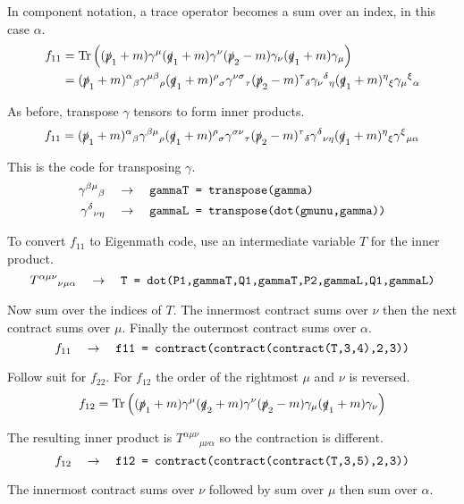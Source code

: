 \documentclass[12pt]{article}
\begin{document}
\noindent
In component notation, a trace operator becomes a sum over an index, in this case $\alpha$.
\begin{align*}
f_{11}
&=
\mathop{\rm Tr}
\left(
(\slashed{p}_1+m)\gamma^\mu(\slashed{q}_1+m)\gamma^\nu(\slashed{p}_2-m)\gamma_\nu(\slashed{q}_1+m)\gamma_\mu
\right)\\
&=
(\slashed{p}_1+m)^\alpha{}_\beta
\gamma^{\mu\beta}{}_\rho
(\slashed{q}_1+m)^\rho{}_\sigma
\gamma^{\nu\sigma}{}_\tau
(\slashed{p}_2-m)^\tau{}_\delta
\gamma_\nu{}^\delta{}_\eta
(\slashed{q}_1+m)^\eta{}_\xi
\gamma_\mu{}^\xi{}_\alpha
\end{align*}

\noindent
As before, transpose $\gamma$ tensors to form inner products.
\begin{equation*}
f_{11}=
(\slashed{p}_1+m)^\alpha{}_\beta
\gamma^{\beta\mu}{}_\rho
(\slashed{q}_1+m)^\rho{}_\sigma
\gamma^{\sigma\nu}{}_\tau
(\slashed{p}_2-m)^\tau{}_\delta
\gamma^\delta{}_{\nu\eta}
(\slashed{q}_1+m)^\eta{}_\xi
\gamma^\xi{}_{\mu\alpha}
\end{equation*}

\noindent
This is the code for transposing $\gamma$.
\begin{align*}
\gamma^{\beta\mu}{}_\beta
&\quad\rightarrow\quad
\text{\tt gammaT = transpose(gamma)}
\\
\gamma^\delta{}_{\nu\eta}
&\quad\rightarrow\quad
\text{\tt gammaL = transpose(dot(gmunu,gamma))}
\end{align*}

\noindent
To convert $f_{11}$ to Eigenmath code, use an intermediate variable $T$ for the inner product.
\begin{equation*}
T^{\alpha\mu\nu}{}_{\nu\mu\alpha}
\quad\rightarrow\quad
\text{\tt T = dot(P1,gammaT,Q1,gammaT,P2,gammaL,Q1,gammaL)}
\end{equation*}

\noindent
Now sum over the indices of $T$.
The innermost contract sums over $\nu$ then the next contract sums over $\mu$.
Finally the outermost contract sums over $\alpha$.
\begin{equation*}
f_{11}\quad\rightarrow\quad
\text{\tt f11 = contract(contract(contract(T,3,4),2,3))}
\end{equation*}

\noindent
Follow suit for $f_{22}$.
For $f_{12}$ the order of the rightmost $\mu$ and $\nu$ is reversed.
\begin{equation*}
f_{12}=\mathop{\rm Tr}
\left(
(\slashed{p}_1+m)\gamma^\mu(\slashed{q}_2+m)\gamma^\nu(\slashed{p}_2-m)\gamma_\mu(\slashed{q}_1+m)\gamma_\nu
\right)
\end{equation*}

\noindent
The resulting inner product is $T^{\alpha\mu\nu}{}_{\mu\nu\alpha}$
so the contraction is different.
\begin{equation*}
f_{12}
\quad\rightarrow\quad
\text{\tt f12 = contract(contract(contract(T,3,5),2,3))}
\end{equation*}

\noindent
The innermost contract sums over $\nu$ followed by sum over $\mu$ then sum over $\alpha$.
\end{document}
